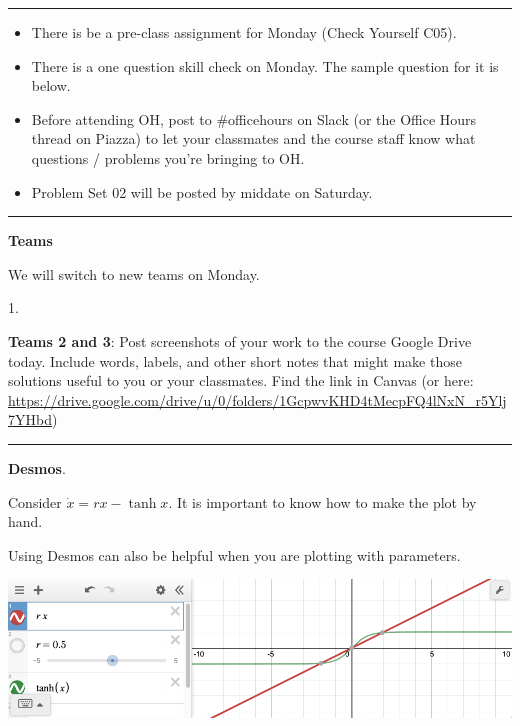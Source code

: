 \documentclass[12pt,letterpaper,noanswers]{exam}
\begin{document}
 \pdfpageheight 11in 
  \pdfpagewidth 8.5in

\vspace{0.2cm}

\hrule
\vspace{0.2cm}

\begin{itemize}
    \item There is be a pre-class assignment for Monday (Check Yourself C05).
    \item There is a one question skill check on Monday.  The sample question for it is below.
    \item Before attending OH, post to \#officehours on Slack (or the Office Hours thread on Piazza) to let your classmates and the course staff know what questions / problems you're bringing to OH.
    \item Problem Set 02 will be posted by middate on Saturday.
\end{itemize}

\hrule
\vspace{0.2cm}

\noindent\textbf{Teams}

We will switch to new teams on Monday.  

\begin{multicols}{2}
1. 
\end{multicols}

\noindent \textbf{Teams 2 and 3}: Post screenshots of your work to the course Google Drive today.  Include words, labels, and other short notes that might make those solutions useful to you or your classmates.  Find the link in Canvas (or here: \url{https://drive.google.com/drive/u/0/folders/1GcpwvKHD4tMecpFQ4lNxN_r5Ylj7YHbd})

\vspace{0.2cm}
\hrule
\vspace{0.2cm}

\noindent\textbf{Desmos}.

Consider $\dot x = r x - \tanh x$.  It is important to know how to make the plot by hand.

Using Desmos can also be helpful when you are plotting with parameters.

\includegraphics[width = 0.5\linewidth]{img/C04desmosp3.png}
\end{document}
